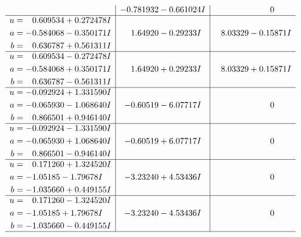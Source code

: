 \documentclass[1p]{elsarticle_modified}
\theoremstyle{definition}
\begin{document}
$$\begin{array}{c|c|c}
 & -0.781932 - 0.661024 I & \phantom{-0.000000 } 0 \\ \hline\begin{aligned}
u &= \phantom{-}0.609534 + 0.272478 I \\
a &= -0.584068 - 0.350171 I \\
b &= \phantom{-}0.636787 + 0.561311 I\end{aligned}
 & \phantom{-}1.64920 - 0.29233 I & \phantom{-}8.03329 - 0.15871 I \\ \hline\begin{aligned}
u &= \phantom{-}0.609534 - 0.272478 I \\
a &= -0.584068 + 0.350171 I \\
b &= \phantom{-}0.636787 - 0.561311 I\end{aligned}
 & \phantom{-}1.64920 + 0.29233 I & \phantom{-}8.03329 + 0.15871 I \\ \hline\begin{aligned}
u &= -0.092924 + 1.331590 I \\
a &= -0.065930 - 1.068640 I \\
b &= \phantom{-}0.866501 + 0.946140 I\end{aligned}
 & -0.60519 - 6.07717 I & \phantom{-0.000000 } 0 \\ \hline\begin{aligned}
u &= -0.092924 - 1.331590 I \\
a &= -0.065930 + 1.068640 I \\
b &= \phantom{-}0.866501 - 0.946140 I\end{aligned}
 & -0.60519 + 6.07717 I & \phantom{-0.000000 } 0 \\ \hline\begin{aligned}
u &= \phantom{-}0.171260 + 1.324520 I \\
a &= -1.05185 - 1.79678 I \\
b &= -1.035660 + 0.449155 I\end{aligned}
 & -3.23240 + 4.53436 I & \phantom{-0.000000 } 0 \\ \hline\begin{aligned}
u &= \phantom{-}0.171260 - 1.324520 I \\
a &= -1.05185 + 1.79678 I \\
b &= -1.035660 - 0.449155 I\end{aligned}
 & -3.23240 - 4.53436 I & \phantom{-0.000000 } 0\\
 \hline 
 \end{array}$$\newpage$$\begin{array}{c|c|c}  

\end{array}$$
\end{document}
